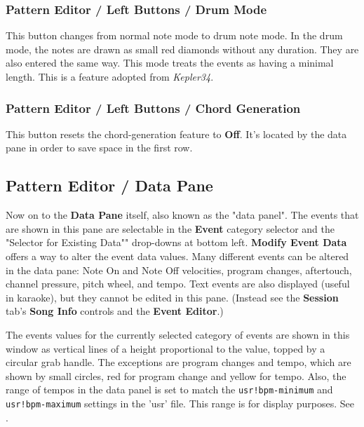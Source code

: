 \subsubsection{Pattern Editor / Left Buttons / Drum Mode}
\label{subsubsec:pattern_editor_left_buttons_drum_mode}

   This button changes from normal note mode to drum note mode. In the drum
   mode, the notes are drawn as small red diamonds without any duration.
   They are also entered the same way.
   This mode treats the events as having a minimal length.
   This is a feature adopted from \textsl{Kepler34}.

\subsubsection{Pattern Editor / Left Buttons / Chord Generation}
\label{subsubsec:pattern_editor_left_buttons_chord_generation}

   This button resets the chord-generation feature to \textbf{Off}.
   It's located by the data pane in order to save space in the first row.

\subsection{Pattern Editor / Data Pane}
\label{subsec:pattern_editor_data_view}

   Now on to the \textbf{Data Pane} itself, also known as the "data panel".
   The events that are shown in this pane
   are selectable in the \textbf{Event} category
   selector and the "Selector for Existing Data"" drop-downs at bottom left.
   \textbf{Modify Event Data} offers a way to
   alter the event data values.
   Many different events can be altered in the data pane:
   Note On and Note Off velocities, program changes, aftertouch, channel
   pressure, pitch wheel, and tempo.
   Text events are also displayed (useful in karaoke), but they cannot be
   edited in this pane.
   (Instead see the \textbf{Session} tab's \textbf{Song Info} controls and
   the \textbf{Event Editor}.)

   The events values for the currently selected category of events are shown
   in this window as vertical lines of a height proportional to the value,
   topped by a circular grab handle.
   The exceptions are program changes and tempo, which are shown by small
   circles, red for program change and yellow for tempo.
   Also, the range of tempos in the data panel is set to match the
   \texttt{usr!bpm-minimum}
   and
   \texttt{usr!bpm-maximum}
   settings in the 'usr' file.
   This range is for display purposes.
   See .

